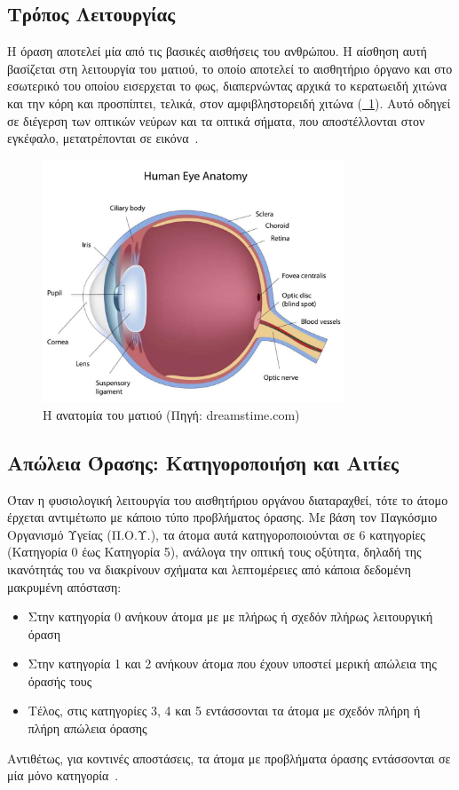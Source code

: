 \subsection{Τρόπος Λειτουργίας}\label{subsec:visionDefinition}
Η όραση αποτελεί μία από τις βασικές αισθήσεις του ανθρώπου. Η αίσθηση αυτή βασίζεται στη λειτουργία του ματιού, το οποίο αποτελεί το αισθητήριο όργανο και στο εσωτερικό του οποίου εισερχεται το φως, διαπερνώντας αρχικά το κερατωειδή χιτώνα και την κόρη και προσπίπτει, τελικά, στον αμφιβληστορειδή χιτώνα (\hyperref[fig:eye_anatomy]{\schema~\ref*{fig:eye_anatomy}}). Αυτό οδηγεί σε διέγερση των οπτικών νεύρων και τα οπτικά σήματα, που αποστέλλονται στον εγκέφαλο, μετατρέπονται σε εικόνα~\cite{nationaleyeinstitute_2022_how}\cite{anspaugh_2022_vision}.

\begin{figure}[!h]
  \centering
  \includegraphics[width=90mm]{images/eye_anatomy.jpg}
  \caption{Η ανατομία του ματιού {\footnotesize(Πηγή: dreamstime.com)}}\label{fig:eye_anatomy}
\end{figure}

\subsection{Απώλεια Όρασης: Κατηγοροποιήση και Αιτίες}\label{subsec:visionCauses}
Όταν η φυσιολογική λειτουργία του αισθητήριου οργάνου διαταραχθεί, τότε το άτομο έρχεται αντιμέτωπο με κάποιο τύπο προβλήματος όρασης. Με βάση τον Παγκόσμιο Οργανισμό Υγείας (Π.Ο.Υ.), τα άτομα αυτά κατηγοροποιούνται σε 6 κατηγορίες (Κατηγορία 0 έως Κατηγορία 5), ανάλογα την οπτική τους οξύτητα, δηλαδή της ικανότητάς του να διακρίνουν σχήματα και λεπτομέρειες από κάποια δεδομένη μακρυμένη απόσταση:
\begin{itemize}
    \item Στην κατηγορία 0 ανήκουν άτομα με με πλήρως ή σχεδόν πλήρως λειτουργική όραση
    \item Στην κατηγορία 1 και 2 ανήκουν άτομα που έχουν υποστεί μερική απώλεια της όρασής τους
    \item Τέλος, στις κατηγορίες 3, 4 και 5 εντάσσονται τα άτομα με σχεδόν πλήρη ή πλήρη απώλεια όρασης
\end{itemize}
Αντιθέτως, για κοντινές αποστάσεις, τα άτομα με προβλήματα όρασης εντάσσονται σε μία μόνο κατηγορία~\cite{worldhealthorganization_2019_world}.

